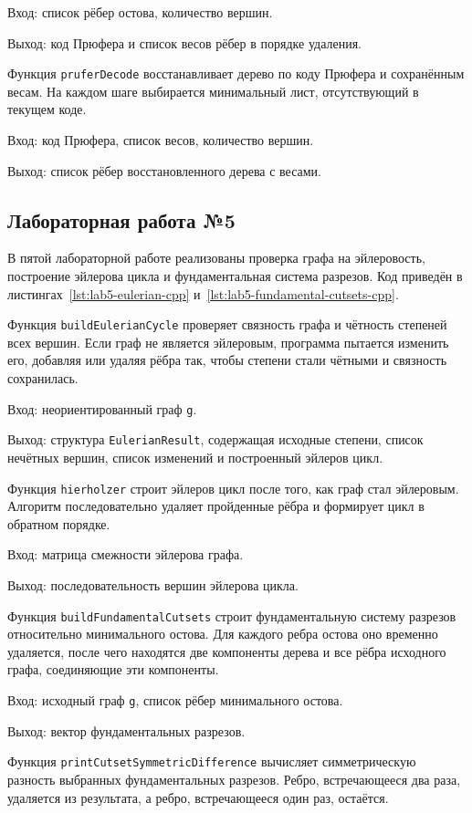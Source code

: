 \documentclass[a4paper,final]{article}
\begin{document}
Вход: список рёбер остова, количество вершин.

Выход: код Прюфера и список весов рёбер в порядке удаления.

Функция \texttt{pruferDecode} восстанавливает дерево по коду Прюфера и сохранённым весам. На каждом шаге выбирается минимальный лист, отсутствующий в текущем коде.

Вход: код Прюфера, список весов, количество вершин.

Выход: список рёбер восстановленного дерева с весами.

\subsection{Лабораторная работа №5}

В пятой лабораторной работе реализованы проверка графа на эйлеровость, построение эйлерова цикла и фундаментальная система разрезов. Код приведён в листингах~\ref{lst:lab5-eulerian-cpp} и~\ref{lst:lab5-fundamental-cutsets-cpp}.

Функция \texttt{buildEulerianCycle} проверяет связность графа и чётность степеней всех вершин. Если граф не является эйлеровым, программа пытается изменить его, добавляя или удаляя рёбра так, чтобы степени стали чётными и связность сохранилась.

Вход: неориентированный граф \texttt{g}.

Выход: структура \texttt{EulerianResult}, содержащая исходные степени, список нечётных вершин, список изменений и построенный эйлеров цикл.

Функция \texttt{hierholzer} строит эйлеров цикл после того, как граф стал эйлеровым. Алгоритм последовательно удаляет пройденные рёбра и формирует цикл в обратном порядке.

Вход: матрица смежности эйлерова графа.

Выход: последовательность вершин эйлерова цикла.

Функция \texttt{buildFundamentalCutsets} строит фундаментальную систему разрезов относительно минимального остова. Для каждого ребра остова оно временно удаляется, после чего находятся две компоненты дерева и все рёбра исходного графа, соединяющие эти компоненты.

Вход: исходный граф \texttt{g}, список рёбер минимального остова.

Выход: вектор фундаментальных разрезов.

Функция \texttt{printCutsetSymmetricDifference} вычисляет симметрическую разность выбранных фундаментальных разрезов. Ребро, встречающееся два раза, удаляется из результата, а ребро, встречающееся один раз, остаётся.
\end{document}
